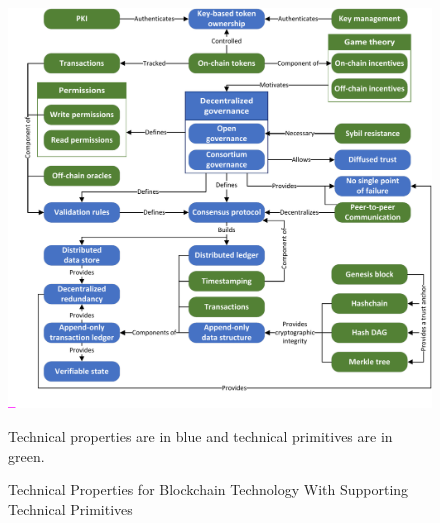\clearpage
\appendix

\begin{figure}[b]
	\centering
	\includegraphics[page=1,width=.75\textwidth]{figures/grounded-theory-main}
	
	Technical properties are in blue and technical primitives are in green.
	\caption{Technical Properties for Blockchain Technology With Supporting Technical Primitives}
	\label{fig:technical-properties-full}
\end{figure}